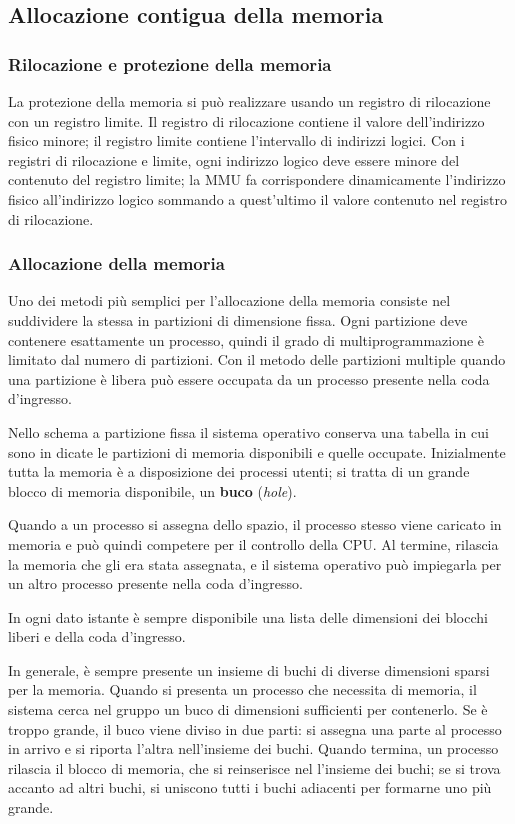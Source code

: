 \documentclass[11pt,a4paper]{article}
\begin{document}
\subsection{Allocazione contigua della memoria}
\subsubsection{Rilocazione e protezione della memoria}
La protezione della memoria si può realizzare usando un
registro di rilocazione con un registro limite. Il registro di rilocazione contiene il valore dell'indirizzo fisico
minore; il registro limite contiene l'intervallo di indirizzi logici. Con i registri di rilocazione e limite, ogni indirizzo logico deve
essere minore del contenuto del registro limite; la MMU fa corrispondere dinamicamente
l'indirizzo fisico all'indirizzo logico sommando a quest'ultimo il valore contenuto nel regi­stro di rilocazione.

\subsubsection{Allocazione della memoria}
Uno dei metodi più semplici per l'allocazione della memoria consiste nel suddividere la stes­sa in partizioni di dimensione fissa. Ogni partizione deve contenere esattamente un proces­so, quindi il grado di multiprogrammazione è limitato dal numero di partizioni. Con il me­todo delle partizioni multiple quando una partizione è libera può essere occupata da un processo presente nella coda d'ingresso.

Nello schema a partizione fissa il sistema operativo conserva una tabella in cui sono in­
dicate le partizioni di memoria disponibili e quelle occupate. Inizialmente tutta la memoria
è a disposizione dei processi utenti; si tratta di un grande blocco di memoria disponibile, un
\textbf{buco} (\emph{hole}).

Quando a un processo si assegna dello spazio, il processo stesso viene caricato in me­moria e può quindi competere per il controllo della CPU. Al termine, rilascia la memoria che
gli era stata assegnata, e il sistema operativo può impiegarla per un altro processo presente
nella coda d'ingresso.

In ogni dato istante è sempre disponibile una lista delle dimensioni dei blocchi liberi e
della coda d'ingresso.

In generale, è sempre presente un insieme di buchi di diverse dimensioni sparsi per la
memoria. Quando si presenta un processo che necessita di memoria, il sistema cerca nel
gruppo un buco di dimensioni sufficienti per contenerlo. Se è troppo grande, il buco viene
diviso in due parti: si assegna una parte al processo in arrivo e si riporta l'altra nell'insieme
dei buchi. Quando termina, un processo rilascia il blocco di memoria, che si reinserisce nel­
l'insieme dei buchi; se si trova accanto ad altri buchi, si uniscono tutti i buchi adiacenti per
formarne uno più grande.
\end{document}
